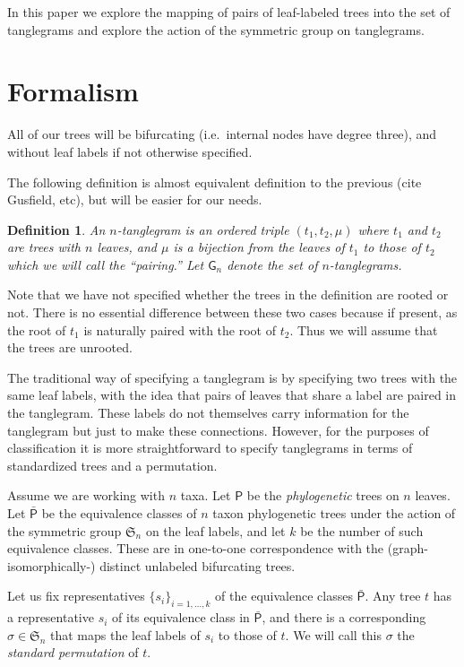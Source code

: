\documentclass{amsart}
\newtheorem{definition}[theorem]{Definition}
\newcommand{\fS}{\mathfrak S}
\newcommand{\pairing}{\mu}
\newcommand{\tangle}{\mathsf{G}}
\newcommand{\ptree}{\mathsf{P}}
\newcommand{\ptequiv}{\bar{\ptree}}  %
\begin{document}
In this paper we explore the mapping of pairs of leaf-labeled trees into the set of tanglegrams and explore the action of the symmetric group on tanglegrams.


\section{Formalism}
All of our trees will be bifurcating (i.e.\ internal nodes have degree three), and without leaf labels if not otherwise specified.

The following definition is almost equivalent definition to the previous (cite Gusfield, etc), but will be easier for our needs.
\begin{definition}
An $n$-\textit{tanglegram} is an ordered triple $(t_1, t_2, \pairing)$ where $t_1$ and $t_2$ are trees with $n$ leaves, and $\pairing$ is a bijection from the leaves of $t_1$ to those of $t_2$ which we will call the ``pairing.''
Let $\tangle_n$ denote the set of $n$-tanglegrams.
\end{definition}
Note that we have not specified whether the trees in the definition are rooted or not.
There is no essential difference between these two cases because if present, as the root of $t_1$ is naturally paired with the root of $t_2$.
Thus we will assume that the trees are unrooted.

The traditional way of specifying a tanglegram is by specifying two trees with the same leaf labels, with the idea that pairs of leaves that share a label are paired in the tanglegram.
These labels do not themselves carry information for the tanglegram but just to make these connections.
However, for the purposes of classification it is more straightforward to specify tanglegrams in terms of standardized trees and a permutation.

Assume we are working with $n$ taxa.
Let $\ptree$ be the \emph{phylogenetic} trees on $n$ leaves.
Let $\ptequiv$ be the equivalence classes of $n$ taxon phylogenetic trees under the action of the symmetric group $\fS_n$ on the leaf labels, and let $k$ be the number of such equivalence classes.
These are in one-to-one correspondence with the (graph-isomorphically-) distinct unlabeled bifurcating trees.

Let us fix representatives $\{s_i\}_{i=1,\ldots,k}$ of the equivalence classes $\ptequiv$.
Any tree $t$ has a representative $s_i$ of its equivalence class in $\ptequiv$, and there is a corresponding $\sigma \in \fS_n$ that maps the leaf labels of $s_i$ to those of $t$.
We will call this $\sigma$ the \emph{standard permutation} of $t$.
\end{document}
